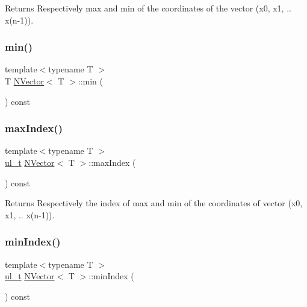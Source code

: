 \begin{DoxyReturn}{Returns}
Respectively max and min of the coordinates of the vector (x0, x1, .. x(n-\/1)). 
\end{DoxyReturn}
\mbox{\label{class_n_vector_ab81d84a1fce6b8647e5fd4e34ec90db7}} 
\subsubsection{\texorpdfstring{min()}{min()}}
{\footnotesize\ttfamily template$<$typename T $>$ \\
T \mbox{\hyperlink{class_n_vector}{N\+Vector}}$<$ T $>$\+::min (\begin{DoxyParamCaption}{ }\end{DoxyParamCaption}) const}

\mbox{\label{class_n_vector_ab0521dd8dc4af0e9167770f85084d2d6}} 
\subsubsection{\texorpdfstring{maxIndex()}{maxIndex()}}
{\footnotesize\ttfamily template$<$typename T $>$ \\
\mbox{\hyperlink{typedef_8h_a1b140a2034db3f5dfe18a987745df43a}{ul\+\_\+t}} \mbox{\hyperlink{class_n_vector}{N\+Vector}}$<$ T $>$\+::max\+Index (\begin{DoxyParamCaption}{ }\end{DoxyParamCaption}) const}

\begin{DoxyReturn}{Returns}
Respectively the index of max and min of the coordinates of vector (x0, x1, .. x(n-\/1)). 
\end{DoxyReturn}
\mbox{\label{class_n_vector_aea9d0e6c8b20628b5e09f8194484a8d3}} 
\subsubsection{\texorpdfstring{minIndex()}{minIndex()}}
{\footnotesize\ttfamily template$<$typename T $>$ \\
\mbox{\hyperlink{typedef_8h_a1b140a2034db3f5dfe18a987745df43a}{ul\+\_\+t}} \mbox{\hyperlink{class_n_vector}{N\+Vector}}$<$ T $>$\+::min\+Index (\begin{DoxyParamCaption}{ }\end{DoxyParamCaption}) const}

